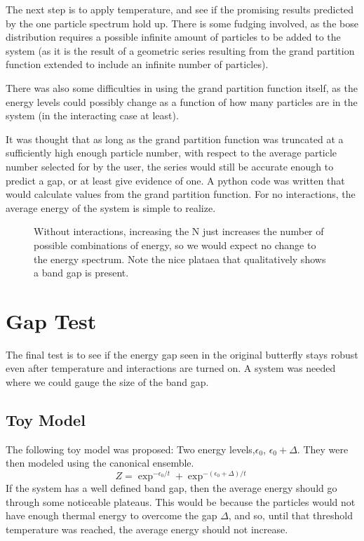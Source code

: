 \documentclass[12pt]{article}
\begin{document}
The next step is to apply temperature, and see if the promising
results predicted by the one particle spectrum hold up.
There is some fudging involved, as the bose distribution requires
a possible infinite amount of particles to be added to the system
(as it is the result of a geometric series resulting from the grand
partition function extended to include an infinite number of particles).

There was also some difficulties in using the grand partition function itself,
as the energy levels could possibly change as a function of how many particles
are in the system (in the interacting case at least).

It was thought that as long as the grand partition function
was truncated at a sufficiently high enough particle number, with respect
to the average particle number selected for by the user, the series would still be accurate enough to predict a gap, or at least give evidence of one.
A python code was written that would calculate values from the grand partition function.
For no interactions, the average energy of the system is simple to realize.
\begin{figure}[H]
	\centerline{}
	\caption{ Without interactions, increasing the N just increases the
	number of possible combinations of energy, so we would expect no
	change to the energy spectrum. Note the nice plataea that qualitatively
	shows a band gap is present.}
	\label{NEnergyavefig}
\end{figure}


\section{Gap Test}
The final test is to see if the energy gap seen in the original
butterfly stays robust even after temperature and interactions
are turned on. A system was needed where we could gauge the
size of the band gap. 
\subsection{Toy Model}
The following toy model was proposed:
Two energy levels,$\epsilon_0$, $\epsilon_0 + \Delta$. They were then modeled
using the canonical ensemble.
\begin{equation} \label{toymodel1}
Z = \exp^{- \epsilon_0 / t} + \exp ^{ - (\epsilon_0 + \Delta) / t}
\end{equation}
If the system has a well defined band gap, then the average energy 
should go through some noticeable plateaus. This would be because the
particles would not have enough thermal energy to overcome the gap $\Delta$,
and so, until that threshold temperature was reached, the average energy
should not increase.
\end{document}
